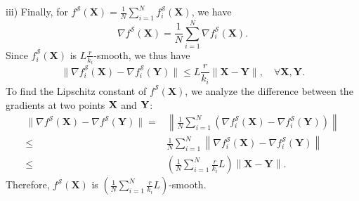 \documentclass{article} %
\theoremstyle{plain}
\theoremstyle{definition}
\begin{document}
iii) Finally, for \( f^{\mathcal{S}}(\mathbf{X}) = \frac{1}{N} \sum_{i=1}^N f_i^{\mathcal{S}}(\mathbf{X}) \), we have 
\[
\nabla f^{\mathcal{S}}(\mathbf{X}) = \frac{1}{N} \sum_{i=1}^N \nabla f_i^{\mathcal{S}}(\mathbf{X}).
\]
Since  \( f_i^{\mathcal{S}}(\mathbf{X}) \) is \( L \frac{r}{k_i} \)-smooth, we thus have
\[
   \|\nabla f_i^{\mathcal{S}}(\mathbf{X}) - \nabla f_i^{\mathcal{S}}(\mathbf{Y})\| \leq L \frac{r}{k_i} \|\mathbf{X} - \mathbf{Y}\|, \quad \forall \mathbf{X}, \mathbf{Y}.
\]
To find the Lipschitz constant of \( f^{\mathcal{S}}(\mathbf{X}) \), we analyze the difference between the gradients at two points \( \bf X \) and \( \bf Y \):
\begin{equation}
    \begin{aligned}
        \|\nabla f^{\mathcal{S}}(\mathbf{X}) - \nabla f^{\mathcal{S}}(\mathbf{Y})\| =& \left\|\frac{1}{N} \sum_{i=1}^N \left(\nabla f_i^{\mathcal{S}}(\mathbf{X}) - \nabla f_i^{\mathcal{S}}(\mathbf{Y})\right)\right\| \\
        \leq & \frac{1}{N} \sum_{i=1}^N \left\| \nabla f_i^{\mathcal{S}}(\mathbf{X}) - \nabla f_i^{\mathcal{S}}(\mathbf{Y})\right\| \\
        \leq & \left( \frac{1}{N} \sum_{i=1}^N \frac{r}{k_i} L \right) \left\| \mathbf{X} - \mathbf{Y}\right\|.
    \end{aligned}
\end{equation}
Therefore, \( f^{\mathcal{S}}(\mathbf{X}) \) is \( \left( \frac{1}{N} \sum_{i=1}^N \frac{r}{k_i} L \right) \)-smooth.
\end{document}
